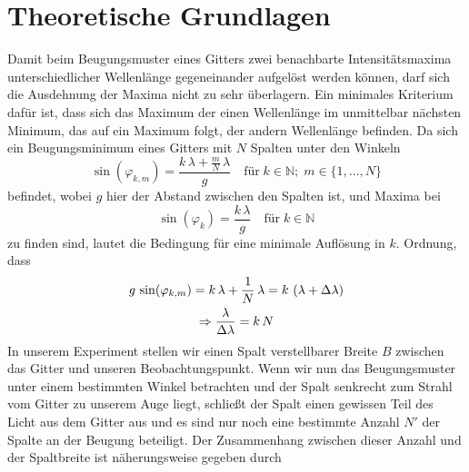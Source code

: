 \documentclass[a4paper, 12pt]{scrartcl}
\begin{document}
\section{Theoretische Grundlagen} 
Damit beim Beugungsmuster eines Gitters zwei benachbarte Intensitätsmaxima unterschiedlicher Wellenlänge gegeneinander aufgelöst werden können, darf sich die Ausdehnung der Maxima nicht zu sehr überlagern. Ein minimales Kriterium dafür ist, dass sich das Maximum der einen Wellenlänge im unmittelbar nächsten Minimum, das auf ein Maximum folgt, der andern Wellenlänge befinden. Da sich ein Beugungsminimum eines Gitters mit $N$ Spalten unter den Winkeln
\begin{equation*}\sin(\varphi_{k,m})=\frac{k\,\lambda+\frac{m}{N}\,\lambda}{g}\quad\text{für}\;k\in\mathbb{N};\;m\in\{1,\dots,N\}\end{equation*}
befindet, wobei $g$ hier der Abstand zwischen den Spalten ist, und Maxima bei 
\begin{equation}\sin(\varphi_k)=\frac{k\,\lambda}{g}\quad\text{für}\;k\in\mathbb{N}\end{equation}
zu finden sind, lautet die Bedingung für eine minimale Auflösung in $k.$ Ordnung, dass
\begin{gather}g\,\sin(\varphi_{k,m})=k\,\lambda+\frac{1}{N}\,\lambda=k\,\left(\lambda+\Delta\lambda\right)\notag\\\Rightarrow\frac{\lambda}{\Delta\lambda}=k\,N\end{gather}
In unserem Experiment stellen wir einen Spalt verstellbarer Breite $B$ zwischen das Gitter und unseren Beobachtungspunkt. Wenn wir nun das Beugungsmuster unter einem bestimmten Winkel betrachten und der Spalt senkrecht zum Strahl vom Gitter zu unserem Auge liegt, schließt der Spalt einen gewissen Teil des Licht aus dem Gitter aus und es sind nur noch eine bestimmte Anzahl $N'$ der Spalte an der Beugung beteiligt. Der Zusammenhang zwischen dieser Anzahl und der Spaltbreite ist näherungsweise gegeben durch
\end{document}
